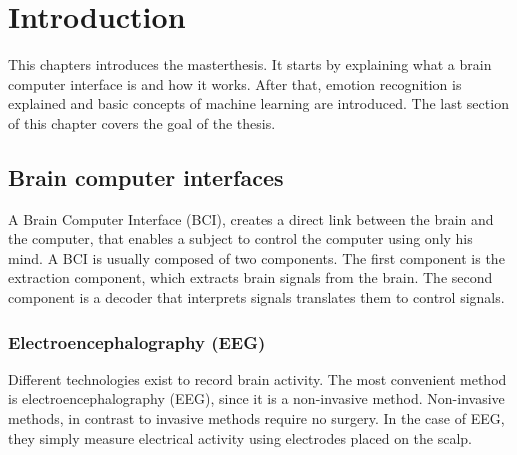 \chapter{Introduction}
{\samenvatting This chapters introduces the masterthesis. It starts by explaining what a brain computer interface is and how it works. After that, emotion recognition is explained and basic concepts of machine learning are introduced. The last section of this chapter covers the goal of the thesis.}


\section{Brain computer interfaces}

A Brain Computer Interface (BCI), creates a direct link between the brain and the computer\cite{LangModel}, that enables a subject to control the computer using only his mind. A BCI is usually composed of two components. The first component is the extraction component, which extracts brain signals from the brain. The second component is a decoder that interprets signals translates them to control signals.


\subsection{Electroencephalography (EEG)}
Different technologies exist to record brain activity. The most convenient method is electroencephalography (EEG), since it is a non-invasive method. Non-invasive methods, in contrast to invasive methods require no surgery. In the case of EEG, they simply measure electrical activity using electrodes placed on the scalp.

\npar


